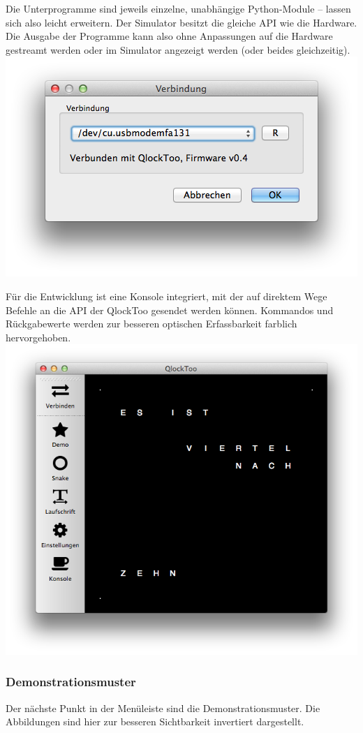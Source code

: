 \begin{multicols}{2}
Die Unterprogramme sind jeweils einzelne, unabhängige Python-Module -- lassen sich also leicht erweitern.
Der Simulator besitzt die gleiche API wie die Hardware. Die Ausgabe der Programme kann also ohne Anpassungen auf die Hardware gestreamt werden oder im Simulator angezeigt werden (oder beides gleichzeitig).
\includegraphics[width=\columnwidth]{Abbildungen/Software/ConnectDialog}

Für die Entwicklung ist eine Konsole integriert, mit der auf direktem Wege Befehle an die API der QlockToo gesendet werden können. Kommandos und Rückgabewerte werden zur besseren optischen Erfassbarkeit farblich hervorgehoben.
\includegraphics[width=0.9\columnwidth,draft]{Abbildungen/Software/Manager}


\subsubsection{Demonstrationsmuster}
Der nächste Punkt in der Menüleiste sind die Demonstrationsmuster.
Die Abbildungen sind hier zur besseren Sichtbarkeit invertiert dargestellt.


\end{multicols}
